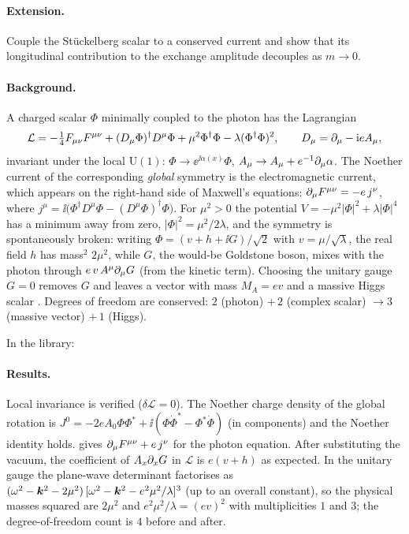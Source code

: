 \paragraph{Extension.} Couple the St\"uckelberg scalar to a conserved current and show that its longitudinal contribution to the exchange amplitude decouples as $m\to0$.


\paragraph{Background.} A charged scalar $\Phi$ minimally coupled to the photon has the Lagrangian
\begin{equation}
\mathcal L=-\tfrac14F_{\mu\nu}F^{\mu\nu}+(D_\mu\Phi)^\dagger D^\mu\Phi+\mu^2\Phi^\dagger\Phi-\lambda(\Phi^\dagger\Phi)^2,\qquad D_\mu=\partial_\mu-\mathrm{i} eA_\mu,
\end{equation}
invariant under the local $\mathrm U(1)$: $\Phi\to\ee^{\ii\alpha(x)}\Phi$, $A_\mu\to A_\mu+e^{-1}\partial_\mu\alpha$. The Noether current of the corresponding \emph{global} symmetry is the electromagnetic current, which appears on the right-hand side of Maxwell's equations: $\partial_\mu F^{\mu\nu}=-e\,j^\nu$, where $j^\mu=\ii\big(\Phi^\dagger D^\mu\Phi-(D^\mu\Phi)^\dagger\Phi\big)$. For $\mu^2>0$ the potential $V=-\mu^2|\Phi|^2+\lambda|\Phi|^4$ has a minimum away from zero, $|\Phi|^2=\mu^2/2\lambda$, and the symmetry is spontaneously broken: writing $\Phi=(v+h+\ii G)/\sqrt2$ with $v=\mu/\sqrt\lambda$, the real field $h$ has mass$^2$ $2\mu^2$, while $G$, the would-be Goldstone boson, mixes with the photon through $e\,v\,A^\mu\partial_\mu G$ (from the kinetic term). Choosing the unitary gauge $G=0$ removes $G$ and leaves a vector with mass $M_A=ev$ and a massive Higgs scalar \cite{Higgs1964,EnglertBrout1964,GHK1964}. Degrees of freedom are conserved: $2$ (photon) $+\,2$ (complex scalar) $\to 3$ (massive vector) $+\,1$ (Higgs).

In the library:


\paragraph{Results.} Local invariance is verified ($\delta\mathcal L=0$). The Noether charge density of the global rotation is $J^0=-2eA_0\Phi\Phi^*+\ii(\Phi\dot\Phi^*-\Phi^*\dot\Phi)$ (in components) and the Noether identity holds.  gives $\partial_\mu F^{\mu\nu}+e\,j^\nu$ for the photon equation. After substituting the vacuum, the coefficient of $A_x\partial_xG$ in $\mathcal L$ is $e(v+h)$ as expected. In the unitary gauge the plane-wave determinant factorises as $(\omega^2-\bm{k}^2-2\mu^2)\,[\omega^2-\bm{k}^2-e^2\mu^2/\lambda]^3$ (up to an overall constant), so the physical masses squared are $2\mu^2$ and $e^2\mu^2/\lambda=(ev)^2$ with multiplicities $1$ and $3$; the degree-of-freedom count is $4$ before and after.


